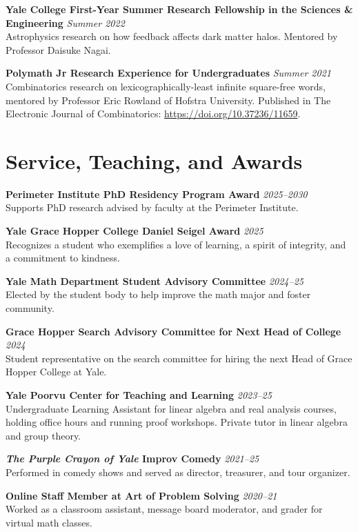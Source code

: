 \documentclass[11pt]{article}
\newcommand{\entry}[3]{
    \vspace{-.58em}
    \textbf{#1} \hfill \textit{#2} \\
    #3 \vspace{0.5em}}
\begin{document}
\entry{Yale College First-Year Summer Research Fellowship in the Sciences \& Engineering}{Summer 2022}{
Astrophysics research on how feedback affects dark matter halos. Mentored by Professor Daisuke Nagai.
}

\entry{Polymath Jr Research Experience for Undergraduates}{Summer 2021}{
Combinatorics research on lexicographically-least infinite square-free words, mentored by Professor Eric Rowland of Hofstra University. Published in The Electronic Journal of Combinatorics: \href{https://doi.org/10.37236/11659}{https://doi.org/10.37236/11659}.
}


\section*{Service, Teaching, and Awards}
\vspace{0.58em}
\vspace{-0.1em}

\entry{Perimeter Institute PhD Residency Program Award}{2025--2030}{
Supports PhD research advised by faculty at the Perimeter Institute.
}

\entry{Yale Grace Hopper College Daniel Seigel Award}{2025}{
Recognizes a student who exemplifies a love of learning, a spirit of integrity, and a commitment to kindness.
}

\entry{Yale Math Department Student Advisory Committee}{2024--25}{
Elected by the student body to help improve the math major and foster community.
}

\entry{Grace Hopper Search Advisory Committee for Next Head of College}{2024}{
Student representative on the search committee for hiring the next Head of Grace Hopper College at Yale.
}

\entry{Yale Poorvu Center for Teaching and Learning}{2023--25}{
Undergraduate Learning Assistant for linear algebra and real analysis courses, holding office hours and running proof workshops. Private tutor in linear algebra and group theory.
}

\entry{\textit{The Purple Crayon of Yale} Improv Comedy}{2021--25}{
Performed in comedy shows and served as director, treasurer, and tour organizer.
}

\entry{Online Staff Member at Art of Problem Solving}{2020--21}{
Worked as a classroom assistant, message board moderator, and grader for virtual math classes.
}
\iffalse
\entry{Yale Student Klezmer Band}{2021--}{
   Accordionist and former president.
}

\entry{Brookline High School -- Math Center Coach and Writing Center Coach}{2018-20}{
  \vspace{-1em}
}

\entry{North Carolina Democratic Party}{2020}{
  Volunteered in a phone bank to educate voters and assist with casting absentee ballots in North Carolina.
}
\fi
\end{document}
